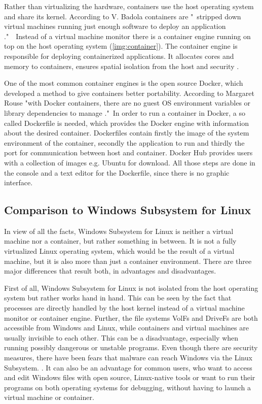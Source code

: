 \documentclass[utf8,biblatex, ngerman, english]{lni}
\begin{document}
Rather than virtualizing the hardware, containers use the host operating system and share its kernel. According to V. Badola containers are "\ stripped down virtual machines running just enough software to deploy an application \cite{Ba15}."\ \ Instead of a virtual machine monitor there is a container engine running on top on the host operating system (\ref{img:container}). 
The container engine is responsible for deploying containerized applications. It allocates cores and memory to containers, ensures spatial isolation from the host and security \cite{Do17}.

One of the most common container engines is the open source Docker, which developed a method to give containers better portability. According to Margaret Rouse "with Docker containers, there are no guest OS environment variables or library dependencies to manage \cite{Ma}."\ In order to run a container in Docker, a so called Dockerfile is needed, which provides the Docker engine with information about the desired container.
Dockerfiles contain firstly the image of the system environment of the container, secondly the application to run and thirdly the port for communication between host and container. Docker Hub provides users with a collection of images e.g. Ubuntu for download. All those steps are done in the console and a text editor for the Dockerfile, since there is no graphic interface.

\subsection{Comparison to Windows Subsystem for Linux}

In view of all the facts, Windows Subsystem for Linux is neither a virtual machine nor a container, but rather something in between. It is not a fully virtualized Linux operating system, which would be the result of a virtual machine, but it is also more than just a container environment. There are three major differences that result both, in advantages and disadvantages. 

First of all, Windows Subsystem for Linux is not isolated from the host operating system but rather works hand in hand. This can be seen by the fact that processes are directly handled by the host kernel instead of a virtual machine monitor or container engine. Further, the file systems VolFs and DriveFs are both accessible from Windows and Linux, while containers and virtual machines are usually invisible to each other. This can be a disadvantage, especially when running possibly dangerous or unstable programs. Even though there are security measures, there have been fears that malware can reach Windows via the Linux Subsystem. \cite{Tu17}. It can also be an advantage for common users, who want to access and edit Windows files with open source, Linux-native tools or want to run their programs on both operating systems for debugging, without having to launch a virtual machine or container.
\end{document}
